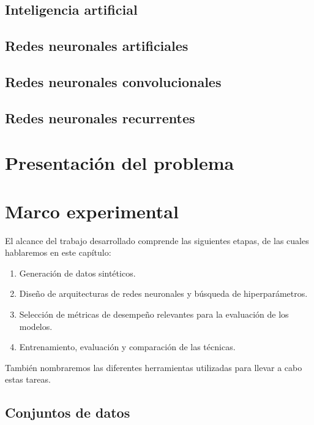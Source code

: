 \documentclass[a4paper,12pt,spanish]{book}
\begin{document}
\section{Inteligencia artificial}


\section{Redes neuronales artificiales} \label{sec:rna}


\section{Redes neuronales convolucionales}


\section{Redes neuronales recurrentes} \label{sec:recurrentes}



\chapter{Presentación del problema} \label{chap:problema}



\chapter{Marco experimental}
El alcance del trabajo desarrollado comprende las siguientes etapas, de las cuales
hablaremos en este capítulo:
\begin{enumerate}[itemsep=0.1cm, label=\textbf{\arabic*.}]
    \item Generación de datos sintéticos.
    \item Diseño de arquitecturas de redes neuronales y búsqueda de hiperparámetros.
    \item Selección de métricas de desempeño relevantes para la evaluación de los modelos.
    \item Entrenamiento, evaluación y comparación de las técnicas.
\end{enumerate}

También nombraremos las diferentes herramientas utilizadas para llevar a cabo estas
tareas.

\section{Conjuntos de datos} \label{sec:datos}

\end{document}
